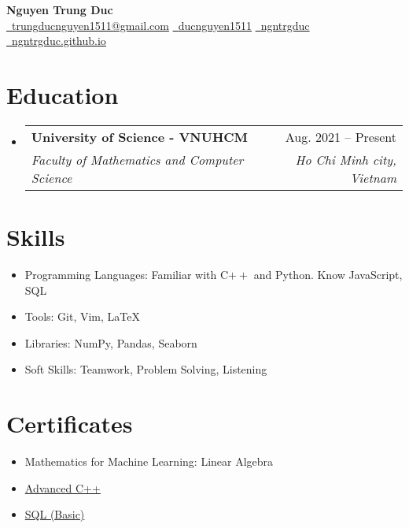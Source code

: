 \documentclass[letterpaper,11pt]{article}
\makeatletter
\newcommand{\resumeItem}[1]{
  \item\small{
    {#1 \vspace{-4pt}}
  }
}
\newcommand{\resumeSubheadFour}[4]{
  \vspace{-1pt}\item
    \begin{tabular*}{0.97\textwidth}[t]{l@{\extracolsep{\fill}}r}
      \textbf{#1} & #2 \\
      \textit{\small#3} & \textit{\small #4} \\
    \end{tabular*}\vspace{-5pt}
}
\newcommand{\resumeSubHeadingListStart}{\begin{itemize}[leftmargin=*]}
\newcommand{\resumeSubHeadingListEnd}{\end{itemize}}
\makeatother
\begin{document}
\begin{center}
    {\Huge \textbf{Nguyen Trung Duc}} \\
    \vspace{6pt}
    \href{mailto:trungducnguyen1511@gmail.com}{\faEnvelope\ trungducnguyen1511@gmail.com}
    \quad
    \href{https://www.linkedin.com/in/ducnguyen1511/}{\faLinkedin\ {ducnguyen1511}} 
    \quad
    \href{https://github.com/ngntrgduc}{\faGithub\ {ngntrgduc}}
    \quad
    \href{https://ngntrgduc.github.io/}{\faGlobe\ {ngntrgduc.github.io}}
    \vspace{-6pt}
\end{center}



\section{Education}
  \resumeSubHeadingListStart
    \resumeSubheadFour{University of Science - VNUHCM}{Aug. 2021 -- Present}
      {Faculty of Mathematics and Computer Science}{Ho Chi Minh city, Vietnam}
  \resumeSubHeadingListEnd


\section{Skills}
    \resumeSubHeadingListStart
        \resumeItem{Programming Languages: Familiar with C$++$ and Python. Know JavaScript, SQL}
        \resumeItem{Tools: Git, Vim, LaTeX}
        \resumeItem{Libraries: NumPy, Pandas, Seaborn}
        \resumeItem{Soft Skills: Teamwork, Problem Solving, Listening}
    \resumeSubHeadingListEnd


\section{Certificates}
    \resumeSubHeadingListStart
        \resumeItem{Mathematics for Machine Learning: Linear Algebra}
        \resumeItem{\href{https://codelearn.io/certification/ndblztg4}{Advanced C++}}
        \resumeItem{\href{https://www.hackerrank.com/certificates/0cbeca00b68c}{SQL (Basic)}}
        
    \resumeSubHeadingListEnd
\end{document}
